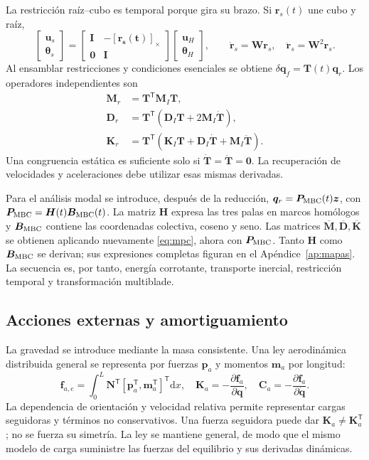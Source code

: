 \documentclass[oneside,a4paper,spanish,links,pagenumbers]{amca}
\newcommand{\Sx}[1]{[\bm{#1}]_\times}
\newcommand{\I}{\bm I}
\newcommand{\dd}{\mathrm d}
\newcommand{\tr}{\mathsf T}
\begin{document}
La restricción raíz--cubo es temporal porque gira su brazo. Si $\bm r_s(t)$ une cubo y raíz,
\begin{equation}
 \begin{bmatrix}\bm u_s\\\bm\theta_s\end{bmatrix}
 =\begin{bmatrix}\I&-\Sx{r_s(t)}\\\bm0&\I\end{bmatrix}
 \begin{bmatrix}\bm u_H\\\bm\theta_H\end{bmatrix},\qquad
 \dot{\bm r}_s=\bm W\bm r_s,\quad \ddot{\bm r}_s=\bm W^2\bm r_s.
\end{equation}
Al ensamblar restricciones y condiciones esenciales se obtiene $\delta\bm q_f=\bm T(t)\bm q_r$. Los operadores independientes son
\begin{align}
 \bm M_r&=\bm T^\tr\bm M_I\bm T,\\
 \bm D_r&=\bm T^\tr(\bm D_I\bm T+2\bm M_I\dot{\bm T}),\\
 \bm K_r&=\bm T^\tr(\bm K_I\bm T+\bm D_I\dot{\bm T}+\bm M_I\ddot{\bm T}).
 \label{eq:mpc}
\end{align}
Una congruencia estática es suficiente solo si $\dot{\bm T}=\ddot{\bm T}=\bm0$. La recuperación de velocidades y aceleraciones debe utilizar esas mismas derivadas.

Para el análisis modal se introduce, después de la reducción, $\bm q_r=\bm P_{\rm MBC}(t)\bm z$, con $\bm P_{\rm MBC}=\bm H(t)\bm B_{\rm MBC}(t)$. La matriz $\bm H$ expresa las tres palas en marcos homólogos y $\bm B_{\rm MBC}$ contiene las coordenadas colectiva, coseno y seno. Las matrices $\overline{\bm M},\overline{\bm D},\overline{\bm K}$ se obtienen aplicando nuevamente \eqref{eq:mpc}, ahora con $\bm P_{\rm MBC}$. Tanto $\bm H$ como $\bm B_{\rm MBC}$ se derivan; sus expresiones completas figuran en el Apéndice~\ref{ap:mapas}. La secuencia es, por tanto, energía corrotante, transporte inercial, restricción temporal y transformación multiblade.

\subsection{Acciones externas y amortiguamiento}
La gravedad se introduce mediante la masa consistente. Una ley aerodinámica distribuida general se representa por fuerzas $\bm p_a$ y momentos $\bm m_a$ por longitud:
\begin{equation}
 \bm f_{a,e}=\int_0^L\bm N^\tr[\bm p_a^\tr,\bm m_a^\tr]^\tr\dd x,
 \quad \bm K_a=-\frac{\partial\bm f_a}{\partial\bm q},\quad
 \bm C_a=-\frac{\partial\bm f_a}{\partial\dot{\bm q}}.
 \label{eq:viento}
\end{equation}
La dependencia de orientación y velocidad relativa permite representar cargas seguidoras y términos no conservativos. Una fuerza seguidora puede dar $\bm K_a\ne\bm K_a^\tr$; no se fuerza su simetría. La ley se mantiene general, de modo que el mismo modelo de carga suministre las fuerzas del equilibrio y sus derivadas dinámicas.
\end{document}
